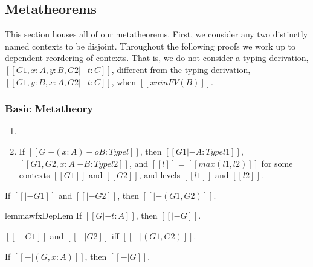 \subsection{Metatheorems}
\label{subsec:metatheorems}
This section houses all of our metatheorems.  First, we consider any
two distinctly named contexts to be disjoint. Throughout the following
proofs we work up to dependent reordering of contexts.  That is, we do
not consider a typing derivation, $[[G1,x : A,y : B,G2 |- t : C]]$,
different from the typing derivation, $[[G1,y : B,x : A,G2 |- t :
    C]]$, when $[[x nin FV(B)]]$.

\subsubsection{Basic Metatheory}
\label{subsec:basic_metatheory}

\begin{lemma}
  \label{lemma:inversion_principles}
  \begin{enumerate}[label=\roman*.]
  \item[] 
  \item If $[[G |- (x : A) -o B : Type l]]$, then $[[G1 |- A : Type l1]]$,
    $[[G1,G2, x : A |- B : Type l2]]$, and $[[l]] = [[max(l1,l2)]]$ for some contexts $[[G1]]$ and
    $[[G2]]$, and levels $[[l1]]$ and $[[l2]]$.
  \end{enumerate}
\end{lemma}

\begin{lemma}
  \label{lemma:well-formed_context_dependency_append}
  If $[[|- G1]]$ and $[[|- G2]]$, then $[[|- (G1,G2)]]$.
\end{lemma}

\begin{restatable}{lemma}{wfxDepLem}
  \label{lemma:well-formed_context_dependency}
  If $[[G |- t : A]]$, then $[[|- G]]$.  
\end{restatable}

\begin{lemma}
  \label{lemma:well-formed_linear_contexts_append}
  $[[-| G1]]$ and $[[-| G2]]$ iff $[[-| (G1,G2)]]$.
\end{lemma}

\begin{lemma}
  \label{lemma:well-formed_linear_contexts_extension}
  If $[[-| (G,x : A)]]$, then $[[-| G]]$.
\end{lemma}

